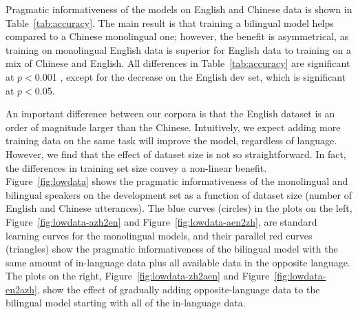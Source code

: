 \documentclass[11pt,a4paper]{article}
\newenvironment{zh}{\begin{CJK}{UTF8}{gbsn}}{\end{CJK}}
\renewcommand{\|}{\mid}
\newcommand{\figref}[1]{Figure~\ref{#1}}
\newcommand{\Figref}[1]{Figure~\ref{#1}}
\newcommand{\tabref}[1]{Table~\ref{#1}}
\begin{document}
Pragmatic informativeness of the models on English and Chinese data is shown in \tabref{tab:accuracy}. The main result is that training a
bilingual model helps compared to a Chinese monolingual one; however, the benefit is asymmetrical, as training on monolingual English data is superior for English data to training on a mix of
Chinese and English. All differences in \tabref{tab:accuracy} are significant at $p < {}$0.001 \citep[approximate permutation test, 10,000 samples;][]{Pado2006}, except for the
decrease on the English dev set, which is significant at $p < {}$0.05.

An important difference between our corpora is that the English dataset is an order of magnitude larger than the Chinese. Intuitively, we expect adding more training data on the same task will
improve the model, regardless of language. However, we find that the effect of dataset size is not so straightforward. In fact, the differences in training set size convey a non-linear benefit.
\Figref{fig:lowdata} shows the pragmatic informativeness of the monolingual and bilingual speakers on the development set
as a function of dataset size (number of English and Chinese utterances). The blue curves (circles) in the plots on the left, 
\figref{fig:lowdata-azh2en} and \figref{fig:lowdata-aen2zh}, are standard learning curves for the monolingual 
models, and their parallel red curves (triangles) show the pragmatic informativeness of the bilingual model with the
same amount of in-language data plus all available data in the opposite language. The plots on the right, 
\figref{fig:lowdata-zh2aen} and \figref{fig:lowdata-en2azh}, show the effect of gradually adding 
opposite-language data to the bilingual model starting with all of the in-language data.
\end{document}
